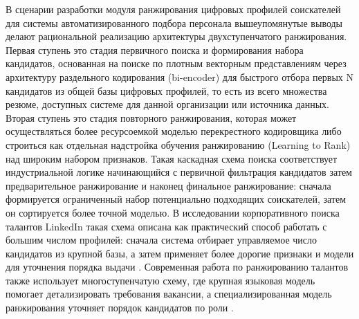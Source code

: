 В сценарии разработки модуля ранжирования цифровых профилей соискателей для системы автоматизированного подбора персонала вышеупомянутые выводы делают рациональной реализацию архитектуры двухступенчатого ранжирования. Первая ступень это стадия первичного поиска и формирования набора кандидатов, основанная на поиске по плотным векторным представлениям через архитектуру раздельного кодирования (bi-encoder) для быстрого отбора первых N кандидатов из общей базы цифровых профилей, то есть из всего множества резюме, доступных системе для данной организации или источника данных. Вторая ступень это стадия повторного ранжирования, которая может осуществляться более ресурсоемкой моделью перекрестного кодировщика либо строиться как отдельная надстройка обучения ранжированию (Learning to Rank) над широким набором признаков. Такая каскадная схема поиска соответствует индустриальной логике начинающийся с первичной фильтрация кандидатов затем предварительное ранжирование и наконец финальное ранжирование: сначала формируется ограниченный набор потенциально подходящих соискателей, затем он сортируется более точной моделью. В исследовании корпоративного поиска талантов LinkedIn такая схема описана как практический способ работать с большим числом профилей: сначала система отбирает управляемое число кандидатов из крупной базы, а затем применяет более дорогие признаки и модели для уточнения порядка выдачи \cite{src38}. Современная работа по ранжированию талантов также использует многоступенчатую схему, где крупная языковая модель помогает детализировать требования вакансии, а специализированная модель ранжирования уточняет порядок кандидатов по роли \cite{src17}.

